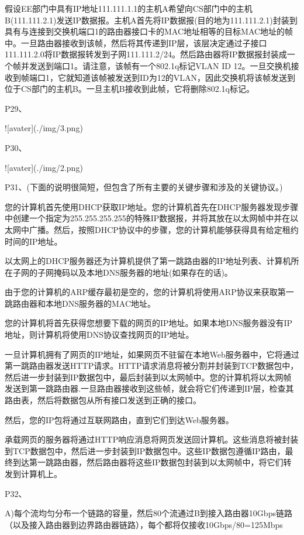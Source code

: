 \documentclass[11pt,UTF8,twoside]{article}
\begin{document}
{		假设EE部门中具有IP地址111.111.1.1的主机A希望向CS部门中的主机B(111.111.2.1)发送IP数据报。主机A首先将IP数据报(目的地为111.111.2.1)封装到具有与连接到交换机端口1的路由器接口卡的MAC地址相等的目标MAC地址的帧中。一旦路由器接收到该帧，然后将其传递到IP层，该层决定通过子接口111.111.2.0将IP数据报转发到子网111.111.2/24。然后路由器将IP数据报封装成一个帧并发送到端口1。请注意，该帧有一个802.1q标记VLAN ID 12。一旦交换机接收到帧端口1，它就知道该帧被发送到ID为12的VLAN，因此交换机将该帧发送到位于CS部门的主机B。一旦主机B接收到此帧，它将删除802.1q标记。
		
		P29、
		
		![avater](./img/3.png)
		
		P30、
		
		![avater](./img/2.png)
		
		P31、(下面的说明很简短，但包含了所有主要的关键步骤和涉及的关键协议。)
		
		您的计算机首先使用DHCP获取IP地址。您的计算机首先在DHCP服务器发现步骤中创建一个指定为255.255.255.255的特殊IP数据报，并将其放在以太网帧中并在以太网中广播。然后，按照DHCP协议中的步骤，您的计算机能够获得具有给定租约时间的IP地址。
		
		以太网上的DHCP服务器还为计算机提供了第一跳路由器的IP地址列表、计算机所在子网的子网掩码以及本地DNS服务器的地址(如果存在的话)。
		
		由于您的计算机的ARP缓存最初是空的，您的计算机将使用ARP协议来获取第一跳路由器和本地DNS服务器的MAC地址。
		
		您的计算机将首先获得您想要下载的网页的IP地址。如果本地DNS服务器没有IP地址，则计算机将使用DNS协议查找网页的IP地址。
		
		一旦计算机拥有了网页的IP地址，如果网页不驻留在本地Web服务器中，它将通过第一跳路由器发送HTTP请求。HTTP请求消息将被分割并封装到TCP数据包中，然后进一步封装到IP数据包中，最后封装到以太网帧中。您的计算机将以太网帧发送到第一跳路由器.一旦路由器接收到这些帧，就会将它们传递到IP层，检查其路由表，然后将数据包从所有接口发送到正确的接口。
		
		然后，您的IP包将通过互联网路由，直到它们到达Web服务器。
		
		承载网页的服务器将通过HTTP响应消息将网页发送回计算机。这些消息将被封装到TCP数据包中，然后进一步封装到IP数据包中。这些IP数据包遵循IP路由，最终到达第一跳路由器，然后路由器将这些IP数据包封装到以太网帧中，将它们转发到计算机上。
		
		P32、
		
		A)每个流均匀分布一个链路的容量，然后80个流通过B到接入路由器10Gbps链路（以及接入路由器到边界路由器链路），每个都将仅接收10Gbps/80=125Mbps
		
}
\end{document}
